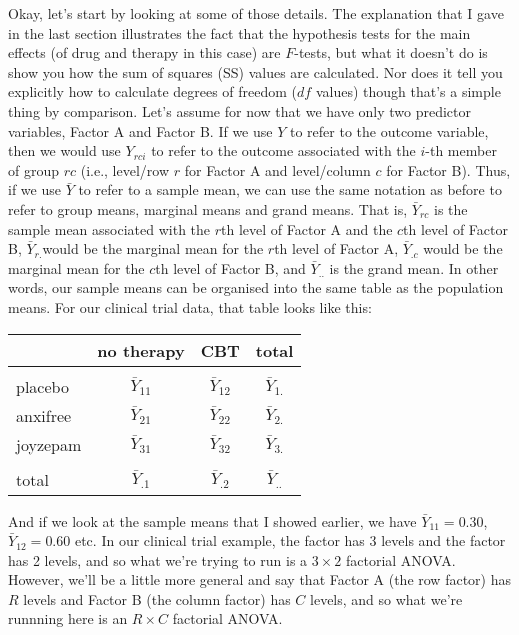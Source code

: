 Okay, let's start by looking at some of those details. The explanation that I gave in the last section illustrates the fact that the hypothesis tests for the main effects (of drug and therapy in this case) are $F$-tests, but what it doesn't do is show you how the sum of squares (SS) values are calculated. Nor does it tell you explicitly how to calculate degrees of freedom ($df$ values) though that's a simple thing by comparison. Let's assume for now that we have only two predictor variables, Factor A and Factor B. If we use $Y$ to refer to the outcome variable, then we would use $Y_{rci}$ to refer to the outcome associated with the $i$-th member of group $rc$ (i.e., level/row $r$ for Factor A and level/column $c$ for Factor B). Thus, if we use $\bar{Y}$ to refer to a sample mean, we can use the same notation as before to refer to group means, marginal means and grand means. That is, $\bar{Y}_{rc}$ is the sample mean associated with the $r$th level of Factor A and the $c$th level of Factor B, $\bar{Y}_{r.} $would be the marginal mean for the $r$th level of Factor A, $\bar{Y}_{.c}$ would be the marginal mean for the $c$th level of Factor B, and $\bar{Y}_{..}$ is the grand mean. In other words, our sample means can be organised into the same table as the population means. For our clinical trial data, that table looks like this:
\begin{center}
\begin{tabular}{l|cc|c} 
& no therapy & CBT & total \\[1ex] \hline &&&\\[-6pt]
placebo & $\bar{Y}_{11}$ & $\bar{Y}_{12}$ & $\bar{Y}_{1.}$  \\[1ex]
anxifree & $\bar{Y}_{21}$ & $\bar{Y}_{22}$ & $\bar{Y}_{2.}$  \\[1ex]
joyzepam & $\bar{Y}_{31}$ &$\bar{Y}_{32}$ & $\bar{Y}_{3.}$ \\[1ex] \hline  &&&\\[-6pt]
total & $\bar{Y}_{.1}$ & $\bar{Y}_{.2}$  &  $\bar{Y}_{..}$
\end{tabular}
\end{center}
And if we look at the sample means that I showed earlier, we have $\bar{Y}_{11} = 0.30$, $\bar{Y}_{12} = 0.60$ etc. In our clinical trial example, the  factor has 3 levels and the  factor has 2 levels, and so what we're trying to run is a $3 \times 2$ factorial ANOVA. However, we'll be a little more general and say that Factor A (the row factor) has $R$ levels and Factor B (the column factor) has $C$ levels, and so what we're runnning here is an $R \times C$ factorial ANOVA.


